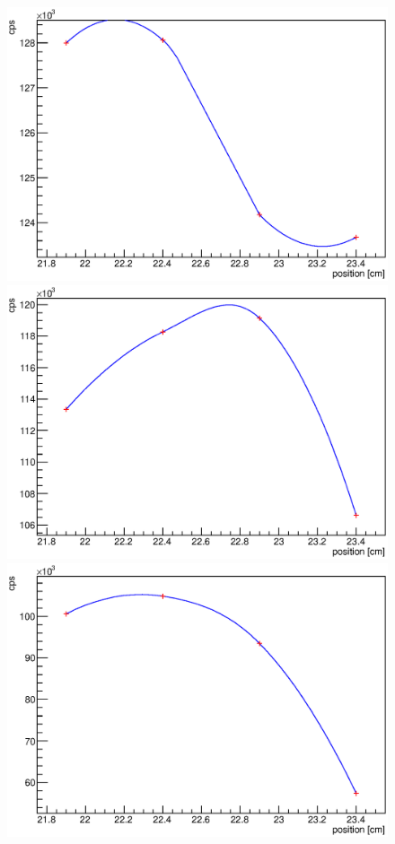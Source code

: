   \begin{figure}
	\centering
 	\begin{minipage}[d]{0.24 \textwidth}
		  \includegraphics[width=\textwidth]{graphics/cobalt/modules/1A.eps}
	\end{minipage}
	\begin{minipage}[d]{0.24 \textwidth}
		  \includegraphics[width=\textwidth]{graphics/cobalt/modules/1B.eps}
	\end{minipage}
	\begin{minipage}[d]{0.24 \textwidth}
		  \includegraphics[width=\textwidth]{graphics/cobalt/modules/2A.eps}

\end{minipage}
\end{figure}
